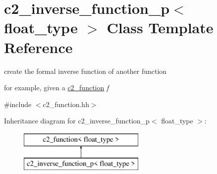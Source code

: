 \hypertarget{classc2__inverse__function__p}{\section{c2\-\_\-inverse\-\_\-function\-\_\-p$<$ float\-\_\-type $>$ Class Template Reference}
\label{classc2__inverse__function__p}
}


create the formal inverse function of another function

for example, given a \hyperlink{classc2__function}{c2\-\_\-function} {\itshape f}  




{\ttfamily \#include $<$c2\-\_\-function.\-hh$>$}

Inheritance diagram for c2\-\_\-inverse\-\_\-function\-\_\-p$<$ float\-\_\-type $>$\-:\begin{figure}[H]
\begin{center}
\leavevmode
\includegraphics[height=2.000000cm]{classc2__inverse__function__p}
\end{center}
\end{figure}
